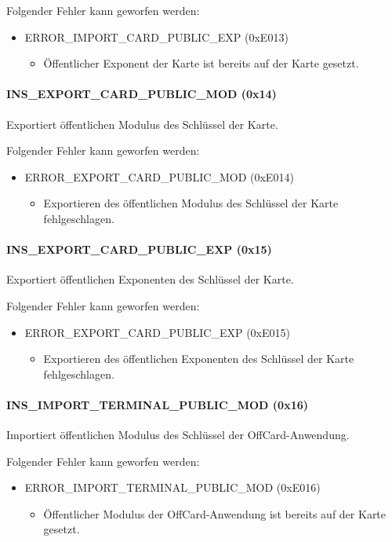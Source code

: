 Folgender Fehler kann geworfen werden:
\begin{itemize}
	\item ERROR\_IMPORT\_CARD\_PUBLIC\_EXP (0xE013)
	\begin{itemize}
		\item Öffentlicher Exponent der Karte ist bereits auf der Karte gesetzt.
	\end{itemize}
\end{itemize}
\paragraph{INS\_EXPORT\_CARD\_PUBLIC\_MOD (0x14)} Exportiert öffentlichen Modulus des Schlüssel der Karte.

Folgender Fehler kann geworfen werden:
\begin{itemize}
	\item ERROR\_EXPORT\_CARD\_PUBLIC\_MOD (0xE014)
	\begin{itemize}
		\item Exportieren des öffentlichen Modulus des Schlüssel der Karte fehlgeschlagen.
	\end{itemize}
\end{itemize}
\paragraph{INS\_EXPORT\_CARD\_PUBLIC\_EXP (0x15)} Exportiert öffentlichen Exponenten des Schlüssel der Karte.

Folgender Fehler kann geworfen werden:
\begin{itemize}
	\item ERROR\_EXPORT\_CARD\_PUBLIC\_EXP (0xE015)
	\begin{itemize}
		\item Exportieren des öffentlichen Exponenten des Schlüssel der Karte fehlgeschlagen.
	\end{itemize}
\end{itemize}
\paragraph{INS\_IMPORT\_TERMINAL\_PUBLIC\_MOD (0x16)} Importiert öffentlichen Modulus des Schlüssel der OffCard-Anwendung.

Folgender Fehler kann geworfen werden:
\begin{itemize}
	\item ERROR\_IMPORT\_TERMINAL\_PUBLIC\_MOD (0xE016)
	\begin{itemize}
		\item Öffentlicher Modulus der OffCard-Anwendung ist bereits auf der Karte gesetzt.
	\end{itemize}
\end{itemize}
